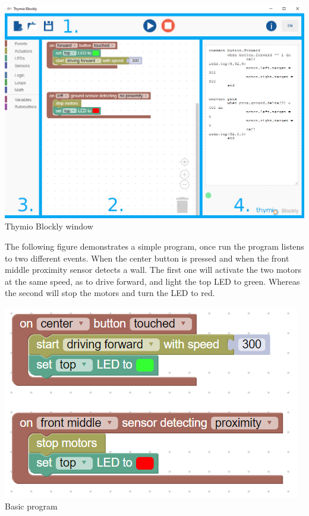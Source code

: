 \documentclass{scrartcl}
\begin{document}
\begin{center}
  \includegraphics[scale=0.5]{./Blockly/blockly_window}\\
  Thymio Blockly window
\end{center}

The following figure demonstrates a simple program, once run the program listens to two different events. When the center button is pressed and when the front middle proximity sensor detects a wall. 
The first one will activate the two motors at the same speed, as to drive forward, and light the top LED to green. Whereas the second will stop the motors and turn the LED to red. \\
\begin{center}
  \includegraphics[scale=0.5]{./Blockly/forward_stop_wall}\\
  Basic program
\end{center}
\end{document}
